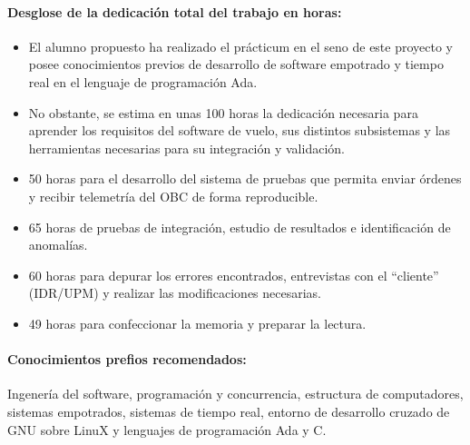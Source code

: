 \paragraph{Desglose de la dedicación total del trabajo en horas:}
\begin{itemize}
\item El alumno propuesto ha realizado el prácticum en el seno de este proyecto
  y posee conocimientos previos de desarrollo de software empotrado y tiempo
  real en el lenguaje de programación Ada.
\item No obstante, se estima en unas 100 horas la dedicación necesaria para
  aprender los requisitos del software de vuelo, sus distintos subsistemas y
  las herramientas necesarias para su integración y validación.
\item 50 horas para el desarrollo del sistema de pruebas que permita enviar
  órdenes y recibir telemetría del OBC de forma reproducible.
\item 65 horas de pruebas de integración, estudio de resultados e
  identificación de anomalías.
\item 60 horas para depurar los errores encontrados, entrevistas con
  el ``cliente'' (IDR/UPM) y realizar las modificaciones necesarias.
\item 49 horas para confeccionar la memoria y preparar la lectura.
\end{itemize}

\paragraph{Conocimientos prefios recomendados:}
Ingenería del software, programación y concurrencia, estructura de computadores,
sistemas empotrados, sistemas de tiempo real, entorno de desarrollo cruzado
de GNU sobre LinuX y lenguajes de programación Ada y C.